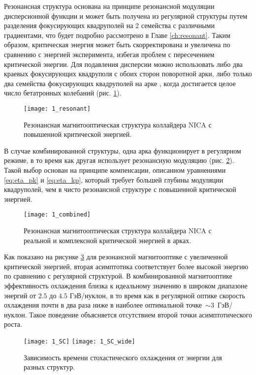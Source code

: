 \noindent Резонансная структура основана на принципе резонансной модуляции дисперсионной функции \cite{senichev:construction} и может быть получена из регулярной структуры путем разделения фокусирующих квадруполей на 2 семейства с различными градиентами, что будет подробно рассмотрено в Главе \ref{ch:resonant}. Таким образом, критическая энергия может быть скорректирована и увеличена по сравнению с энергией эксперимента, избегая проблем с пересечением критической энергии. Для подавления дисперсии можно использовать либо два краевых фокусирующих квадруполя с обоих сторон поворотной арки, либо только два семейства фокусирующих квадруполей на арке \cite{Kolokolchikov:2021trans}, когда достигается целое число бетатронных колебаний (рис. \ref{fig:1_resonant}).

\begin{figure}[!h]
  \centering
   \texttt{[image: 1\_resonant]}
   \caption{Резонансная магнитооптическая структура коллайдера NICA с повышенной критической энергией.}
   \label{fig:1_resonant}
\end{figure}

\noindent В случае комбинированной структуры, одна арка функционирует в регулярном режиме, в то время как другая использует резонансную модуляцию (рис. \ref{fig:1_combined}). Такой выбор основан на принципе компенсации, описанном уравнениями \ref{eq:eta_pk} и \ref{eq:eta_kp}, который требует большей глубины модуляции квадруполей, чем в чисто резонансной структуре с повышенной критической энергией.

\begin{figure}[!h]
  \centering
   \texttt{[image: 1\_combined]}
   \caption{Резонансная магнитооптическая структура коллайдера NICA с реальной и комплексной критической энергией в арках.}
   \label{fig:1_combined}
\end{figure}

\noindent Как показано на рисунке \ref{fig:1_SC} для резонансной магнитооптике с увеличенной критической энергией, вторая асимптотика соответствует более высокой энергию по сравнению с регулярной структурой. В комбинированной магнитооптике эффективность охлаждения близка к идеальному значению в широком диапазоне энергий от $2.5$ до $4.5$ ГэВ/нуклон, в то время как в регулярной оптике скорость охлаждения почти в два раза ниже в наиболее оптимальной точке~$\sim3$~ГэВ/нуклон. Такое поведение объясняется отсутствием второй точки асимптотического роста.

\begin{figure}[!h]
  \centering
   \texttt{[image: 1\_SC]}
   \texttt{[image: 1\_SC\_wide]}
   \caption{Зависимость времени стохастического охлаждения от энергии для разных структур.}
   \label{fig:1_SC}
\end{figure}

